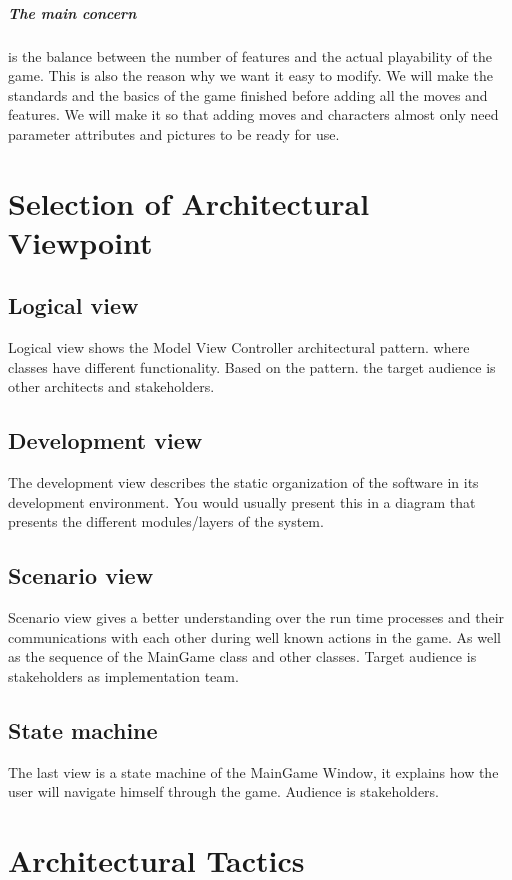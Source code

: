 \paragraph{The main concern} is the balance between the number of features and the actual playability of the game. This is also the reason why we want it easy to modify. We will make the standards and the basics of the game finished before adding all the moves and features. We will make it so that adding moves and characters almost only need parameter attributes and pictures to be ready for use.

\chapter{Selection of Architectural Viewpoint}

\section{Logical view}
Logical view shows the Model View Controller architectural pattern. where classes have different functionality. Based on the pattern. the target audience is other architects and stakeholders.

\section{Development view}
The development view describes the static organization of the software in its development environment. You would usually present this in a diagram that presents the different modules/layers of the system.

\section{Scenario view}
Scenario view gives a better understanding over the run time processes and their communications with each other during well known actions in the game. As well as the sequence of the MainGame class and other classes. Target audience is stakeholders as implementation team.

\section{State machine}
The last view is a state machine of the MainGame Window, it explains how the user will navigate himself through the game. Audience is stakeholders.

\chapter{Architectural Tactics}

